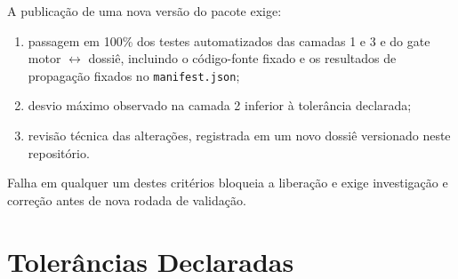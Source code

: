 \documentclass[11pt,a4paper]{article}
\begin{document}
A publicação de uma nova versão do pacote exige:

\begin{enumerate}
  \item passagem em 100\% dos testes automatizados das camadas 1 e 3 e do gate motor \(\leftrightarrow\) dossiê, incluindo o código-fonte fixado e os resultados de propagação fixados no \texttt{manifest.json};
  \item desvio máximo observado na camada 2 inferior à tolerância declarada;
  \item revisão técnica das alterações, registrada em um novo dossiê versionado neste repositório.
\end{enumerate}

Falha em qualquer um destes critérios bloqueia a liberação e exige investigação e correção antes de nova rodada de validação.

\section{Tolerâncias Declaradas}
\label{sec:tolerancias}
\end{document}
